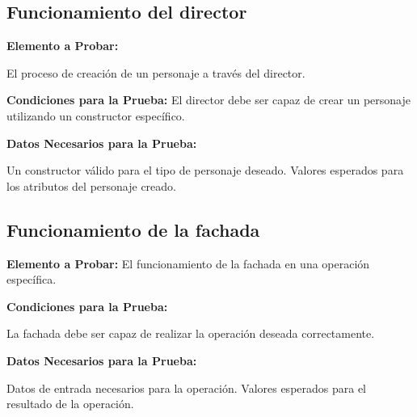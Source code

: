 \documentclass{article}
\begin{document}
\begin{itemize}
\subsection{Funcionamiento del director}

   \textbf{ Elemento a Probar:} 
   
   El proceso de creación de un personaje a través del director.
   
   \textbf{ Condiciones para la Prueba:}
        El director debe ser capaz de crear un personaje utilizando un constructor específico.
        
    \textbf{Datos Necesarios para la Prueba:}
    
        Un constructor válido para el tipo de personaje deseado.
        Valores esperados para los atributos del personaje creado.

\subsection{Funcionamiento de la fachada}

   \textbf{ Elemento a Probar:} 
   El funcionamiento de la fachada en una operación específica.
   
    \textbf{Condiciones para la Prueba:}
    
        La fachada debe ser capaz de realizar la operación deseada correctamente.
        
   \textbf{ Datos Necesarios para la Prueba:}
   
        Datos de entrada necesarios para la operación.
        Valores esperados para el resultado de la operación.

\end{itemize}
\end{document}
